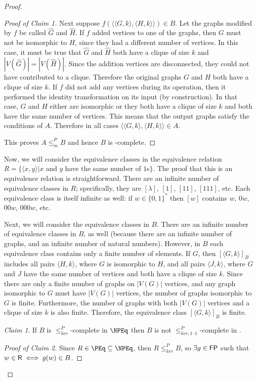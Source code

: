 \documentclass[draft]{article}
\theoremstyle{definition} \newtheorem{openproblem}[openproblem]{Open problem}
\theoremstyle{definition} \newtheorem{definition}[definition]{Definition}
\theoremstyle{remark} \newtheorem{remark}{Remark}
\newtheorem{claim}{Claim}
\newcommand{\sigmastar}{\{0, 1\}^{*}} %
\newcommand{\kr}{\leq^{P}_{ker}} %
\newcommand{\kri}{\leq^{P}_{ker,1\text{--}1}} %
\newcommand{\mor}{\leq^{P}_{m}} %
\newcommand{\pair}[2]{\langle#1,#2\rangle} %
\begin{document}
\begin{proof}
\begin{proof}[Proof of Claim 1]
    Next suppose $f(\pair{\pair{G}{k}}{\pair{H}{k}})\in B$.
    Let the graphs modified by $f$ be called $\hat{G}$ and $\hat{H}$.
    If $f$ added vertices to one of the graphs, then $G$ must not be isomorphic to $H$, since they had a different number of vertices.
    In this case, it must be true that $\hat{G}$ and $\hat{H}$ both have a clique of size $k$ and $|V(\hat{G})|=|V(\hat{H})|$.
    Since the addition vertices are disconnected, they could not have contributed to a clique.
    Therefore the original graphs $G$ and $H$ both have a clique of size $k$.
    If $f$ did not add any vertices during its operation, then it performed the identity transformation on its input (by construction).
    In that case, $G$ and $H$ either are isomorphic or they both have a clique of size $k$ and both have the same number of vertices.
    This means that the output graphs satisfy the conditions of $A$.
    Therefore in all cases $\pair{\pair{G}{k}}{\pair{H}{k}}\in A$.

    This proves $A\mor B$ and hence $B$ is \NP-complete.
  \end{proof}

  Now, we will consider the equivalence classes in the equivalence relation $R=\{\pair{x}{y}|x$ and $y$ have the same number of $1$s$\}$.
  The proof that this is an equivalence relation is straightforward.
  There are an infinite number of equivalence classes in $R$; specifically, they are $[\lambda]$, $[1]$, $[11]$, $[111]$, etc.
  Each equivalence class is itself infinite as well: if $w\in\sigmastar$ then $[w]$ contains $w$, $0w$, $00w$, $000w$, etc.

  Next, we will consider the equivalence classes in $B$.
  There are an infinite number of equivalence classes in $B$, as well (because there are an infinite number of graphs, and an infinite number of natural numbers).
  However, in $B$ each equivalence class contains only a finite number of elements.
  If $G$, then $[\pair{G}{k}]_B$ includes all pairs $\pair{H}{k}$, where $G$ is isomorphic to $H$, and all pairs $\pair{J}{k}$, where $G$ and $J$ have the same number of vertices and both have a clique of size $k$.
  Since there are only a finite number of graphs on $|V(G)|$ vertices, and any graph isomorphic to $G$ must have $|V(G)|$ vertices, the number of graphs isomorphic to $G$ is finite.
  Furthermore, the number of graphs with both $|V(G)|$ vertices and a clique of size $k$ is also finite.
  Therefore, the equivalence class $[\pair{G}{k}]_B$ is finite.

  \begin{claim}
    If $B$ is $\kr$-complete in $\NPEq$ then $B$ is not $\kri$-complete in \NPEq.
  \end{claim}
  \begin{proof}[Proof of Claim 2]
    Since $R\in\PEq\subseteq\NPEq$, then $R\kr B$, so $\exists g\in{\ensuremath{\mathsf{FP}}}$ such that $w\in{\ensuremath{\mathsf{R}}}\iff g(w)\in B$.


\end{proof}
\end{proof}
\end{document}
